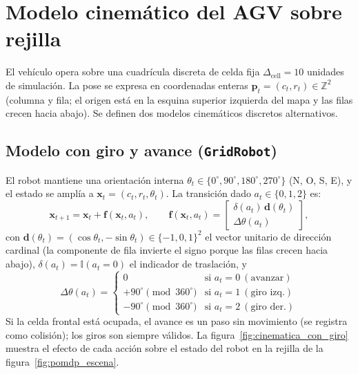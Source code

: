 \section{Modelo cinemático del AGV sobre rejilla}\label{sec:cinematica}
El vehículo opera sobre una cuadrícula discreta de celda fija
$\Delta_{\text{cell}} = 10$ unidades de simulación. La pose se expresa en
coordenadas enteras $\mathbf{p}_t = (c_t, r_t) \in \mathbb{Z}^2$ (columna y
fila; el origen está en la esquina superior izquierda del mapa y las filas
crecen hacia abajo). Se definen dos modelos cinemáticos discretos
alternativos.

\subsection{Modelo con giro y avance (\texttt{GridRobot})}
El robot mantiene una orientación interna
$\theta_t \in \{0^\circ, 90^\circ, 180^\circ, 270^\circ\}$ (N, O, S, E), y
el estado se amplía a $\mathbf{x}_t = (c_t, r_t, \theta_t)$. La transición
dado $a_t \in \{0, 1, 2\}$ es:
\begin{equation}
    \mathbf{x}_{t+1} = \mathbf{x}_t + \mathbf{f}(\mathbf{x}_t, a_t), \qquad
    \mathbf{f}(\mathbf{x}_t, a_t) =
    \begin{bmatrix}
        \delta(a_t)\, \mathbf{d}(\theta_t) \\
        \Delta\theta(a_t)
    \end{bmatrix},
\end{equation}
con $\mathbf{d}(\theta_t) = (\cos\theta_t, -\sin\theta_t) \in \{-1,0,1\}^2$
el vector unitario de dirección cardinal (la componente de fila invierte el
signo porque las filas crecen hacia abajo), $\delta(a_t) = \mathbb{I}(a_t = 0)$
el indicador de traslación, y
\begin{equation}
    \Delta\theta(a_t) =
    \begin{cases}
        0 & \text{si } a_t = 0\ (\text{avanzar})\\
        +90^\circ \pmod{360^\circ} & \text{si } a_t = 1\ (\text{giro izq.})\\
        -90^\circ \pmod{360^\circ} & \text{si } a_t = 2\ (\text{giro der.})
    \end{cases}
\end{equation}
Si la celda frontal está ocupada, el avance es un paso sin movimiento (se
registra como colisión); los giros son siempre válidos. La
figura~\ref{fig:cinematica_con_giro} muestra el efecto de cada acción sobre
el estado del robot en la rejilla de la figura~\ref{fig:pomdp_escena}.

